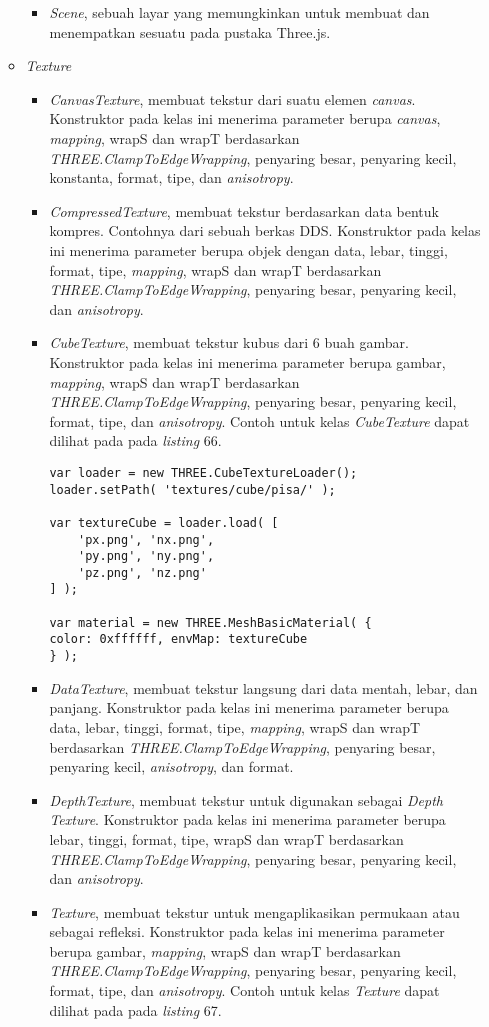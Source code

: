 \documentclass[a4paper,twoside]{article}
\begin{document}
\begin{enumerate}
\begin{itemize}
\begin{itemize}
	\item {\it Scene}, sebuah layar yang memungkinkan untuk membuat dan menempatkan sesuatu pada pustaka Three.js. 
	\end{itemize}
	
\item \textit{Texture}
	\begin{itemize}
	\item{\it CanvasTexture}, membuat tekstur dari suatu elemen {\it canvas}. Konstruktor pada kelas ini menerima parameter berupa {\it canvas}, {\it mapping}, wrapS dan wrapT berdasarkan {\it THREE.ClampToEdgeWrapping}, penyaring besar, penyaring kecil, konstanta, format, tipe, dan {\it anisotropy}.
	\item{\it CompressedTexture}, membuat tekstur berdasarkan data bentuk kompres. Contohnya dari sebuah berkas DDS. Konstruktor pada kelas ini menerima parameter berupa objek dengan data, lebar, tinggi, format, tipe, {\it mapping}, wrapS dan wrapT berdasarkan {\it THREE.ClampToEdgeWrapping}, penyaring besar, penyaring kecil, dan {\it anisotropy}.
	\item{\it CubeTexture}, membuat tekstur kubus dari 6 buah gambar. Konstruktor pada kelas ini menerima parameter berupa gambar, {\it mapping},  wrapS dan wrapT berdasarkan {\it THREE.ClampToEdgeWrapping}, penyaring besar, penyaring kecil, format, tipe, dan {\it anisotropy}. Contoh untuk kelas {\it CubeTexture} dapat dilihat pada pada {\it listing} 66.
	
\begin{lstlisting}[caption={Contoh penggunaan kelas {\it CubeTexture}.},captionpos=b]
var loader = new THREE.CubeTextureLoader();
loader.setPath( 'textures/cube/pisa/' );

var textureCube = loader.load( [
	'px.png', 'nx.png',
	'py.png', 'ny.png',
	'pz.png', 'nz.png'
] );

var material = new THREE.MeshBasicMaterial( { 
color: 0xffffff, envMap: textureCube 
} );
\end{lstlisting}
	
	\item{\it DataTexture}, membuat tekstur langsung dari data mentah, lebar, dan panjang. Konstruktor pada kelas ini menerima parameter berupa data, lebar, tinggi, format, tipe, {\it mapping}, wrapS dan wrapT berdasarkan {\it THREE.ClampToEdgeWrapping}, penyaring besar, penyaring kecil, {\it anisotropy}, dan format.
	\item{\it DepthTexture}, membuat tekstur untuk digunakan sebagai {\it Depth Texture}. Konstruktor pada kelas ini menerima parameter berupa lebar, tinggi, format, tipe, wrapS dan wrapT berdasarkan {\it THREE.ClampToEdgeWrapping}, penyaring besar, penyaring kecil, dan {\it anisotropy}.
	\item {\it Texture}, membuat tekstur untuk mengaplikasikan permukaan atau sebagai refleksi. Konstruktor pada kelas ini menerima parameter berupa gambar, {\it mapping},  wrapS dan wrapT berdasarkan {\it THREE.ClampToEdgeWrapping}, penyaring besar, penyaring kecil, format, tipe, dan {\it anisotropy}. Contoh untuk kelas {\it Texture} dapat dilihat pada pada {\it listing} 67.
	

\end{itemize}
\end{itemize}
\end{enumerate}
\end{document}
